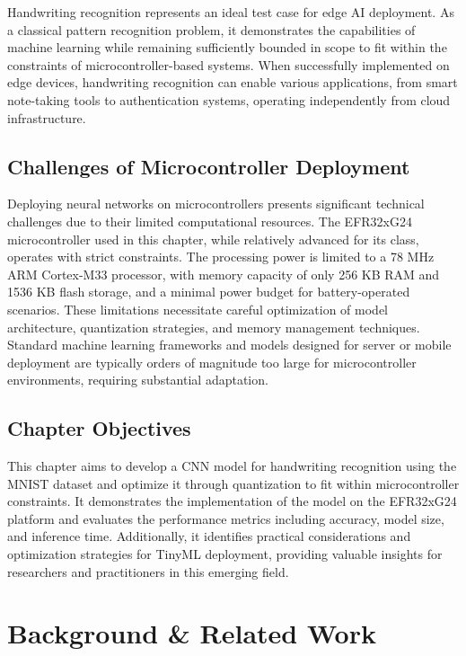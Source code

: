 \documentclass[
  9pt,
  letterpaper,
  abstract,
  titlepage]{scrbook}
\begin{document}
Handwriting recognition represents an ideal test case for edge AI
deployment. As a classical pattern recognition problem, it demonstrates
the capabilities of machine learning while remaining sufficiently
bounded in scope to fit within the constraints of microcontroller-based
systems. When successfully implemented on edge devices, handwriting
recognition can enable various applications, from smart note-taking
tools to authentication systems, operating independently from cloud
infrastructure.

\subsection{Challenges of Microcontroller
Deployment}\label{challenges-of-microcontroller-deployment}

Deploying neural networks on microcontrollers presents significant
technical challenges due to their limited computational resources. The
EFR32xG24 microcontroller used in this chapter, while relatively
advanced for its class, operates with strict constraints. The processing
power is limited to a 78 MHz ARM Cortex-M33 processor, with memory
capacity of only 256 KB RAM and 1536 KB flash storage, and a minimal
power budget for battery-operated scenarios. These limitations
necessitate careful optimization of model architecture, quantization
strategies, and memory management techniques. Standard machine learning
frameworks and models designed for server or mobile deployment are
typically orders of magnitude too large for microcontroller
environments, requiring substantial adaptation.

\subsection{Chapter Objectives}\label{chapter-objectives-1}

This chapter aims to develop a CNN model for handwriting recognition
using the MNIST dataset and optimize it through quantization to fit
within microcontroller constraints. It demonstrates the implementation
of the model on the EFR32xG24 platform and evaluates the performance
metrics including accuracy, model size, and inference time.
Additionally, it identifies practical considerations and optimization
strategies for TinyML deployment, providing valuable insights for
researchers and practitioners in this emerging field.

\section{Background \& Related Work}\label{background-related-work}
\end{document}
